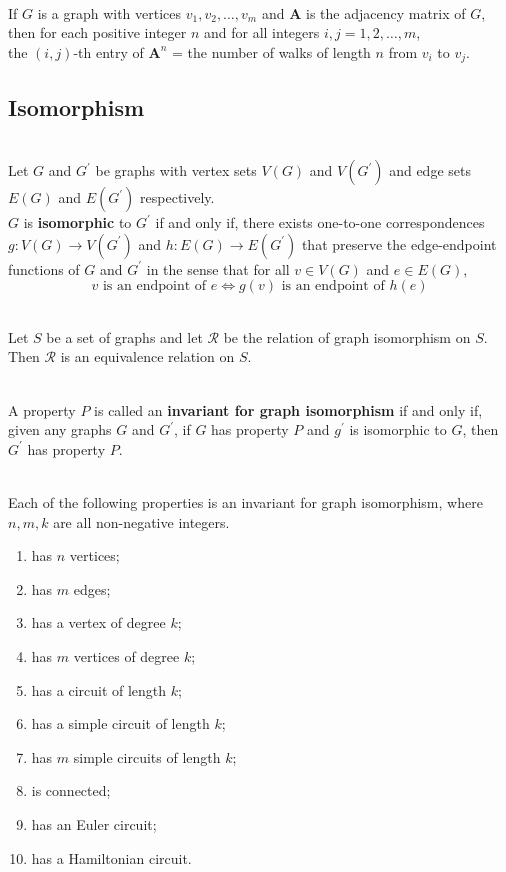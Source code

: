 \documentclass[12pt]{article}
\begin{document}
\begin{theorem}[10.3.2]
\hfill\\
\normalfont If $G$ is a graph with vertices $v_1, v_2,\ldots,v_m$ and $\bm{A}$ is the adjacency matrix of $G$, then for each positive integer $n$ and for all integers $i,j = 1,2,\ldots,m$,\\
the $(i,j)$-th entry of $\bm{A}^n$ = the number of walks of length $n$ from $v_i$ to $v_j$.
\end{theorem}
\subsection{Isomorphism}
\begin{definition}
\hfill\\
\normalfont Let $G$ and $G^\prime$ be graphs with vertex sets $V(G)$ and $V(G^\prime)$ and edge sets $E(G)$ and $E(G^\prime)$ respectively.\\
$G$ is \textbf{isomorphic} to $G^\prime$ if and only if, there exists one-to-one correspondences $g:V(G)\to V(G^\prime)$ and $h:E(G)\to E(G^\prime)$ that preserve the edge-endpoint functions of $G$ and $G^\prime$ in the sense that for all $v\in V(G)$ and $e\in E(G)$,
\[
v\text{ is an endpoint of }e\Leftrightarrow g(v)\text{ is an endpoint of }h(e)
\]
\end{definition}
\begin{theorem}[10.4.1]
\hfill\\
\normalfont Let $S$ be a set of graphs and let $\mathcal{R}$ be the relation of graph isomorphism on $S$. Then $\mathcal{R}$ is an equivalence relation on $S$.
\end{theorem}
\begin{definition}
\hfill\\
\normalfont A property $P$ is called an \textbf{invariant for graph isomorphism} if and only if, given any graphs $G$ and $G^\prime$, if $G$ has property $P$ and $g^\prime$ is isomorphic to $G$, then $G^\prime$ has property $P$.
\end{definition}
\begin{theorem}[10.4.2]
\hfill\\
\normalfont Each of the following properties is an invariant for graph isomorphism, where $n,m,k$ are all non-negative integers.
\begin{enumerate}
\item has $n$ vertices;
\item has $m$ edges;
\item has a vertex of degree $k$;
\item has $m$ vertices of degree $k$;
\item has a circuit of length $k$;
\item has a simple circuit of length $k$;
\item has $m$ simple circuits of length $k$;
\item is connected;
\item has an Euler circuit;
\item has a Hamiltonian circuit.
\end{enumerate}
\end{theorem}
\end{document}
